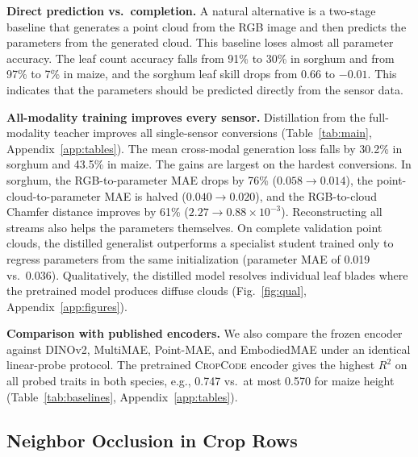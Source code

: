 \documentclass[10pt,twocolumn,letterpaper]{article}
\newcommand{\method}{\textsc{CropCode}}
\begin{document}
\noindent\textbf{Direct prediction vs.\ completion.}
A natural alternative is a two-stage baseline that generates a point cloud from the RGB image and then predicts the parameters from the generated cloud. This baseline loses almost all parameter accuracy. The leaf count accuracy falls from 91\% to 30\% in sorghum and from 97\% to 7\% in maize, and the sorghum leaf skill drops from 0.66 to $-0.01$. This indicates that the parameters should be predicted directly from the sensor data.

\noindent\textbf{All-modality training improves every sensor.}
Distillation from the full-modality teacher improves all single-sensor conversions (Table~\ref{tab:main}, Appendix~\ref{app:tables}). The mean cross-modal generation loss falls by 30.2\% in sorghum and 43.5\% in maize. The gains are largest on the hardest conversions. In sorghum, the RGB-to-parameter MAE drops by 76\% ($0.058 \to 0.014$), the point-cloud-to-parameter MAE is halved ($0.040 \to 0.020$), and the RGB-to-cloud Chamfer distance improves by 61\% ($2.27 \to 0.88 \times 10^{-3}$). Reconstructing all streams also helps the parameters themselves. On complete validation point clouds, the distilled generalist outperforms a specialist student trained only to regress parameters from the same initialization (parameter MAE of 0.019 vs.\ 0.036). Qualitatively, the distilled model resolves individual leaf blades where the pretrained model produces diffuse clouds (Fig.~\ref{fig:qual}, Appendix~\ref{app:figures}).

\noindent\textbf{Comparison with published encoders.}
We also compare the frozen encoder against DINOv2, MultiMAE, Point-MAE, and EmbodiedMAE under an identical linear-probe protocol. The pretrained \method{} encoder gives the highest $R^2$ on all probed traits in both species, e.g., 0.747 vs.\ at most 0.570 for maize height (Table~\ref{tab:baselines}, Appendix~\ref{app:tables}).

\subsection{Neighbor Occlusion in Crop Rows}
\label{sec:regime3}\label{sec:exp-occlusion}
\end{document}
